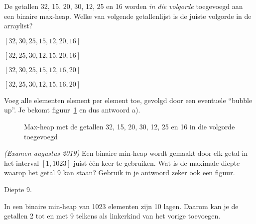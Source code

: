 \begin{oef}
\papier De getallen 32, 15, 20, 30, 12, 25 en 16 worden \emph{in die volgorde} toegevoegd aan een binaire max-heap. Welke van volgende getallenlijst is de juiste volgorde in de arraylist?
\begin{oefenumerate}
\item $[32, 30, 25, 15, 12, 20, 16]$
\item $[32, 25, 30, 12, 15, 20, 16]$
\item $[32, 30, 25, 15, 12, 16, 20]$
\item $[32, 25, 30, 12, 15, 16, 20]$
\end{oefenumerate}

\begin{opl}
Voeg alle elementen element per element toe, gevolgd door een eventuele “bubble up”. Je bekomt figuur~\ref{fig:maxheapbubbleup} en dus antwoord a).
\begin{figure}[htbp]
    \centering
{}
\caption{Max-heap met de getallen 32, 15, 20, 30, 12, 25 en 16 in die volgorde toegevoegd}
    \label{fig:maxheapbubbleup}
\end{figure}
\end{opl}

\end{oef}


\begin{oef}
\papier \emph{(Examen augustus 2019)} Een binaire min-heap wordt gemaakt door elk getal in het interval $[1, 1023]$ juist één keer te gebruiken. Wat is de maximale diepte waarop het getal 9 kan staan? Gebruik in je antwoord zeker ook een figuur.
\begin{opl}
Diepte 9.

In een binaire min-heap van 1023 elementen zijn 10 lagen. Daarom kan je de getallen 2 tot en met 9 telkens als linkerkind van het vorige toevoegen. 
\end{opl}
\end{oef}


